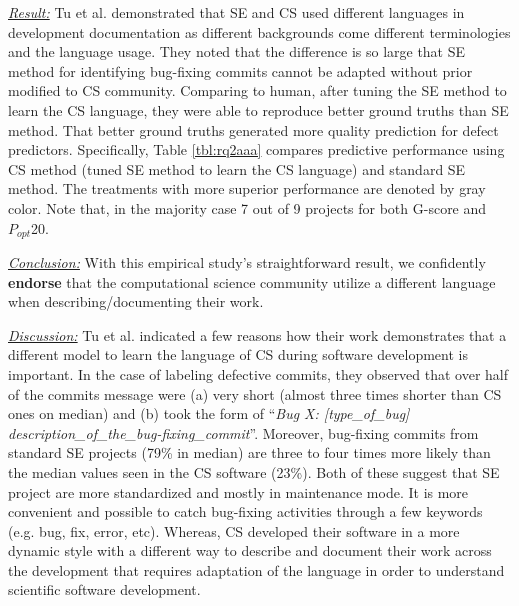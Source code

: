 \documentclass[sigconf,review,anonymous]{acmart}
\newenvironment{RQ}{\vspace{1mm}\begin{tcolorbox}[enhanced,width=3.4in,size=fbox,colback=red!5!white,drop shadow southwest,sharp corners]}{\end{tcolorbox}}
\begin{document}
\noindent \textit{\underline{Result:}} Tu et al. \cite{tu2019better} demonstrated that SE and CS used different languages in development documentation as different backgrounds come different terminologies and the language usage. They noted that the difference is so large that SE method for identifying bug-fixing commits cannot be adapted without prior modified to CS community. Comparing to human, after tuning the SE method to learn the CS language, they were able to reproduce better ground truths than SE method. That better ground truths generated more quality prediction for defect predictors. Specifically, Table \ref{tbl:rq2aaa} compares predictive performance using CS method (tuned SE method to learn the CS language) and standard SE method. The treatments with more superior performance are denoted by gray color. Note that,
in the majority case 7 out of 9 projects for both G-score and $P_{opt}$20. 


\begin{RQ}
\textit{\underline{Conclusion:}} With this empirical study's straightforward result, we confidently \textbf{endorse} that the computational science community utilize a different language when describing/documenting their work. 
\end{RQ} 

\noindent \textit{\underline{Discussion:}}  Tu et al. \cite{tu2019better} indicated a few reasons how their work demonstrates that a different model to learn the language of CS during software development is important. In the case of labeling defective commits, they observed that over half of the commits message were (a) very short (almost three times shorter than CS ones on median) and (b) took the form of
``\textit{Bug X: [type\_of\_bug] description\_of\_the\_bug-fixing\_commit}''. Moreover, bug-fixing commits from standard SE projects (79\% in median)
are three to four times more likely than the median values seen in the CS software (23\%). Both of these suggest that SE project are more standardized and mostly in maintenance mode. It is more convenient  and  possible  to  catch  bug-fixing activities through a few keywords (e.g. bug, fix, error, etc). Whereas, CS developed their software in a more dynamic style with a different way to describe and document their work across the development that requires adaptation of the language in order to understand scientific software development. 
\end{document}
